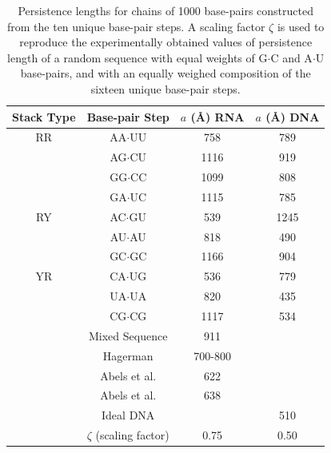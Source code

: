 \begin{table}  
\begin{center}
\begin{tabular}{|c|c|c|c|}
\hline
Stack Type & Base-pair Step & $a$ (\AA) RNA & $a$ (\AA) DNA\\
\hline \hline
RR &  AA$\cdot$UU & 758      &  789   \\
   &  AG$\cdot$CU & 1116     &  919   \\
   &  GG$\cdot$CC & 1099     &  808   \\
   &  GA$\cdot$UC & 1115     &  785   \\
\hline
RY &  AC$\cdot$GU & 539      &  1245   \\
   &  AU$\cdot$AU & 818      &  490   \\
   &  GC$\cdot$GC & 1166     &  904   \\
\hline
YR &  CA$\cdot$UG & 536      &  779   \\
   &  UA$\cdot$UA & 820      &  435   \\
   &  CG$\cdot$CG & 1117     &  534   \\
\hline
   & Mixed Sequence  & 911   &        \\
   & Hagerman   & 700-800    &        \\
   & Abels et al.   & 622    &        \\ 
   & Abels et al.   & 638    &        \\
   & Ideal DNA    &          & 510    \\
   & $\zeta$ (scaling factor)  & 0.75 & 0.50 \\
\hline
\end{tabular}
\caption{Persistence lengths for chains of 1000 base-pairs constructed
  from the ten unique base-pair steps. A scaling factor $\zeta$ is used to
  reproduce the experimentally obtained values of persistence length
  of a random sequence with equal weights of G$\cdot$C and A$\cdot$U
  base-pairs, and with an equally weighed composition of the sixteen
  unique base-pair steps.}
\label{tab:compare}
\end{center}
\end{table}

